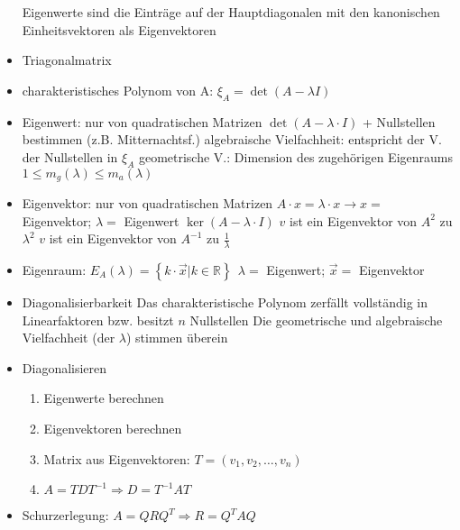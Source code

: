 \documentclass[6pt,a4paper]{scrartcl}
\newcommand{\R}{\ensuremath{\mathbb R}}
\begin{document}
\begin{multicols}{3}
\begin{itemize}
		\subitem Eigenwerte sind die Einträge auf der Hauptdiagonalen mit den kanonischen Einheitsvektoren als Eigenvektoren
	\item Triagonalmatrix
	\item charakteristisches Polynom von A: $\xi_A=\det(A-\lambda I)$
	\item Eigenwert: nur von quadratischen Matrizen
		\subitem $\det(A-\lambda \cdot I)$ + Nullstellen bestimmen (z.B. Mitternachtsf.)
			\subitem algebraische Vielfachheit: entspricht der V. der Nullstellen in $\xi_A$
			\subitem geometrische V.: Dimension des zugehörigen Eigenraums
			\subitem $1\leq m_g(\lambda)\leq m_a(\lambda)$
	\item Eigenvektor: nur von quadratischen Matrizen
		\subitem $A\cdot x = \lambda \cdot x \rightarrow x=$ Eigenvektor; $\lambda=$ Eigenwert
		\subitem $\ker(A-\lambda\cdot I)$
		\subitem $v$ ist ein Eigenvektor von $A^2$ zu $\lambda^2$
		\subitem $v$ ist ein Eigenvektor von $A^{-1}$ zu $\frac{1}{\lambda}$
	\item Eigenraum: $E_A(\lambda) = \left\lbrace k \cdot \vec{x} | k \in \R \right\rbrace ~~ \lambda=$ Eigenwert; $\vec{x}=$ Eigenvektor
	\item Diagonalisierbarkeit
		\subitem Das charakteristische Polynom zerfällt vollständig in Linearfaktoren bzw. besitzt $n$ Nullstellen
		\subitem Die geometrische und algebraische Vielfachheit (der $\lambda$) stimmen überein
	\item Diagonalisieren
	\begin{enumerate}
		\item Eigenwerte berechnen
		\item Eigenvektoren berechnen
		\item Matrix aus Eigenvektoren: $T=\left(v_1, v_2, … , v_n\right)$
		\item $A=T D T^{-1} \Rightarrow D = T^{-1} A T$
	\end{enumerate}
	\item Schurzerlegung: $A=Q R Q^T \Rightarrow R=Q^T A Q$
\end{itemize}
\end{multicols}
\end{document}
